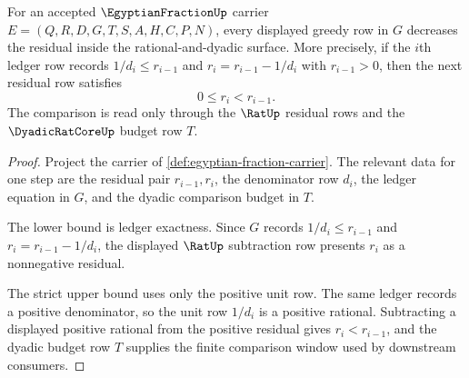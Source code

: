 \begin{theorem}
\label{thm:egyptian-fraction-greedy-step}
For an accepted $\EgyptianFractionUp$ carrier $E=(Q,R,D,G,T,S,A,H,C,P,N)$, every displayed greedy row in $G$ decreases the residual inside the rational-and-dyadic surface. More precisely, if the $i$th ledger row records $1/d_i \leq r_{i-1}$ and $r_i=r_{i-1}-1/d_i$ with $r_{i-1}>0$, then the next residual row satisfies
$$
0 \leq r_i < r_{i-1}.
$$
The comparison is read only through the $\RatUp$ residual rows and the $\DyadicRatCoreUp$ budget row $T$.
\end{theorem}
\begin{proof}
Project the carrier of \autoref{def:egyptian-fraction-carrier}. The relevant data for one step are the residual pair $r_{i-1},r_i$, the denominator row $d_i$, the ledger equation in $G$, and the dyadic comparison budget in $T$.

The lower bound is ledger exactness. Since $G$ records $1/d_i \leq r_{i-1}$ and $r_i=r_{i-1}-1/d_i$, the displayed $\RatUp$ subtraction row presents $r_i$ as a nonnegative residual.

The strict upper bound uses only the positive unit row. The same ledger records a positive denominator, so the unit row $1/d_i$ is a positive rational. Subtracting a displayed positive rational from the positive residual gives $r_i<r_{i-1}$, and the dyadic budget row $T$ supplies the finite comparison window used by downstream consumers.
\end{proof}


